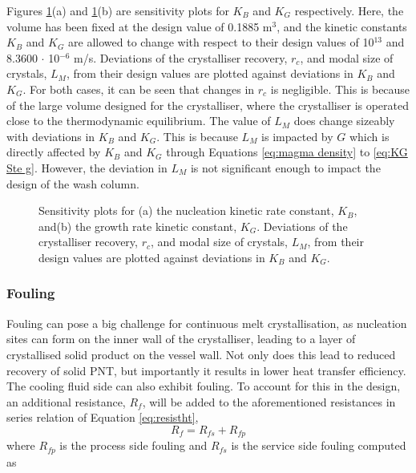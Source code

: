 Figures \ref{fig:sensitivity kinetics}(a) and \ref{fig:sensitivity kinetics}(b) are sensitivity plots for $K_B$ and $K_G$ respectively. Here, the volume has been fixed at the design value of 0.1885 m$^3$, and the kinetic constants $K_B$ and $K_G$ are allowed to change with respect to their design values of 10$^{13}$ and 8.3600 $\cdot$ 10$^{-6}$ m/s. Deviations of the crystalliser recovery, $r_c$, and modal size of crystals, $L_M$, from their design values are plotted against deviations in $K_B$ and $K_G$. For both cases, it can be seen that changes in $r_c$ is negligible. This is because of the large volume designed for the crystalliser, where the crystalliser is operated close to the thermodynamic equilibrium. The value of $L_M$ does change sizeably with deviations in $K_B$ and $K_G$. This is because $L_M$ is impacted by $G$ which is directly affected by $K_B$ and $K_G$ through Equations \ref{eq:magma density} to \ref{eq:KG Ste g}. However, the deviation in $L_M$ is not significant enough to impact the design of the wash column. 

\begin{figure}[h]
    \centering
    
    \caption{Sensitivity plots for (a) the nucleation kinetic rate constant, $K_B$, and(b) the growth rate kinetic constant, $K_G$. Deviations of the crystalliser recovery, $r_c$, and modal size of crystals, $L_M$, from their design values are plotted against deviations in $K_B$ and $K_G$. }
    \label{fig:sensitivity kinetics}
\end{figure}
   
\subsubsection{Fouling}\label{sec:fouling}


Fouling can pose a big challenge for continuous melt crystallisation, as nucleation sites can form on the inner wall of the crystalliser, leading to a layer of crystallised solid product on the vessel wall. Not only does this lead to reduced recovery of solid PNT, but importantly it results in lower heat transfer efficiency. The cooling fluid side can also exhibit fouling. To account for this in the design, an additional resistance, $R_f$, will be added to the aforementioned resistances in series relation of Equation \ref{eq:resistht},
\begin{equation} \label{eq:fouling}
    R_f = R_{fs} + R_{fp}
\end{equation}
where $R_{fp}$ is the process side fouling and $R_{fs}$ is the service side fouling computed as 

